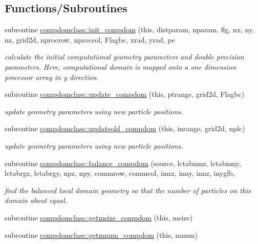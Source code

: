 \subsection*{Functions/\+Subroutines}
\begin{DoxyCompactItemize}
\item 
subroutine \mbox{\hyperlink{namespacecompdomclass_acdfdc48f4091ad70b76c1c7ed66c10b0}{compdomclass\+::init\+\_\+compdom}} (this, distparam, nparam, flg, nx, ny, nz, grid2d, nprocrow, nproccol, Flagbc, xrad, yrad, pe
\begin{DoxyCompactList}\small\item\em calculate the initial computational geometry parameters and double precision parameters. Here, computational domain is mapped onto a one dimension processor array in y direction. \end{DoxyCompactList}\item 
subroutine \mbox{\hyperlink{namespacecompdomclass_a0e7d562b378f77e0d3a14b33168cb46b}{compdomclass\+::update\+\_\+compdom}} (this, ptrange, grid2d, Flagbc)
\begin{DoxyCompactList}\small\item\em update geometry parameters using new particle positions. \end{DoxyCompactList}\item 
subroutine \mbox{\hyperlink{namespacecompdomclass_abf3eab7526c06e30b574ddf8be378826}{compdomclass\+::updateold\+\_\+compdom}} (this, inrange, grid2d, nplc)
\begin{DoxyCompactList}\small\item\em update geometry parameters using new particle positions. \end{DoxyCompactList}\item 
subroutine \mbox{\hyperlink{namespacecompdomclass_a024b1cbd7d29d1bd2ac4285c45b25cb1}{compdomclass\+::balance\+\_\+compdom}} (source, lctabnmz, lctabnmy, lctabrgz, lctabrgy, npz, npy, commrow, commcol, innx, inny, innz, inyglb,
\begin{DoxyCompactList}\small\item\em find the balanced local domain geometry so that the number of particles on this domain about equal. \end{DoxyCompactList}\item 
subroutine \mbox{\hyperlink{namespacecompdomclass_a460a22916802ee9041aa66d1922cb812}{compdomclass\+::getmsize\+\_\+compdom}} (this, msize)
\item 
subroutine \mbox{\hyperlink{namespacecompdomclass_a4742fe5698151e1e31e2261798a433c8}{compdomclass\+::getmnum\+\_\+compdom}} (this, mnum)

\end{DoxyCompactItemize}
